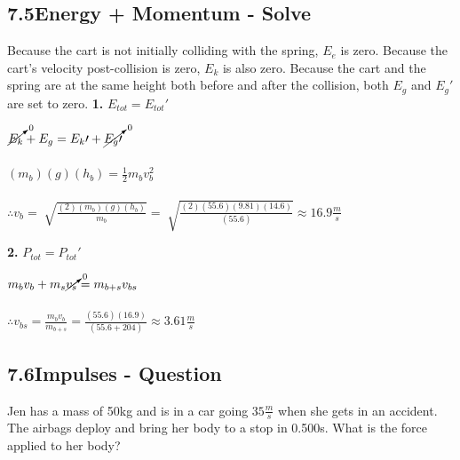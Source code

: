 \documentclass{article}
\begin{document}
\begin{adjustwidth}{1cm}{0pt}
    \subsection*{7.5\hspace*{0.5cm}Energy + Momentum - Solve}
    Because the cart is not initially colliding with the spring, $E_{e}$ is zero. Because the cart's velocity post-collision is zero, $E_{k}$ is also zero. Because the cart and the spring are at the same height both before and after the collision, both $E_{g}$ and $E_{g}\prime$ are set to zero.\newline\newline
    \textbf{1.} $E_{tot} = E_{tot}\prime$ \\
    \begin{adjustwidth}{0.6cm}{0pt}
        $\cancelto{0}{E_{k}} + E_{g} = E_{k}\prime + \cancelto{0}{E_{g}\prime}$ \\\\
        $(m_{b})(g)(h_{b}) = \frac{1}{2}m_{b}v_{b}^2$ \\\\
        $\therefore v_{b} = \sqrt[]{\frac{(2)(m_{b})(g)(h_{b})}{m_{b}}} = \sqrt[]{\frac{(2)(55.6)(9.81)(14.6)}{(55.6)}} \approx 16.9\frac{m}{s}$
    \end{adjustwidth}\vspace*{15pt}
    \textbf{2.} $P_{tot} = P_{tot}\prime$ \\
    \begin{adjustwidth}{0.6cm}{0pt}
        $m_{b}v_{b} + m_{s}\cancelto{0}{v_{s}} = m_{b + s}v_{bs}$ \\\\
        $\therefore v_{bs} = \frac{m_{b}v_{b}}{m_{b + s}} = \frac{(55.6)(16.9)}{(55.6 + 204)} \approx 3.61\frac{m}{s}$
    \end{adjustwidth}\vspace*{15pt}


    \subsection*{7.6\hspace*{0.5cm}Impulses - Question}
    Jen has a mass of 50kg and is in a car going $35\frac{m}{s}$ when she gets in an accident. The airbags deploy and bring her body to a stop in 0.500s. What is the force applied to her body?

\end{adjustwidth}
\end{document}
